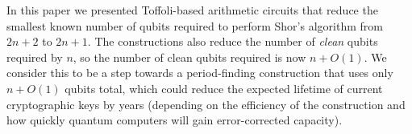 \documentclass[twocolumn]{article}
\begin{document}
In this paper we presented Toffoli-based arithmetic circuits that reduce the smallest known number of qubits required to perform Shor's algorithm from $2n+2$ to $2n+1$.
The constructions also reduce the number of {\em clean} qubits required by $n$, so the number of clean qubits required is now $n + O(1)$.
We consider this to be a step towards a period-finding construction that uses only $n + O(1)$ qubits total, which could reduce the expected lifetime of current cryptographic keys by years (depending on the efficiency of the construction and how quickly quantum computers will gain error-corrected capacity).




\end{document}
